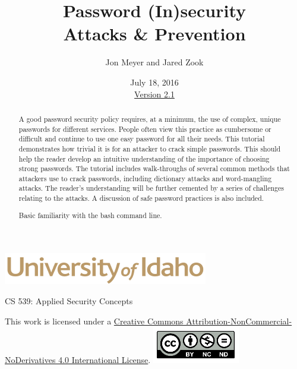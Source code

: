 \documentclass[12pt]{extarticle}
\begin{document}
\title{ Password (In)security \\ \large Attacks \& Prevention}
\author{Jon Meyer and Jared Zook}
\date{July 18, 2016 \\ \hyperref[changelog]{Version 2.1} }
\renewcommand{\abstractname}{Summary}
\begin{titlepage}
\maketitle
{}
\begin{center}
\includegraphics[scale=.5]{UofI}

\large{CS 539: Applied Security Concepts}

\vskip 40pt

\end{center}

\begin{abstract}
A good password security policy requires, at a minimum, the use of complex, unique passwords for different services. People often view this practice as cumbersome or difficult and continue to use one easy password for all their needs. This tutorial demonstrates how trivial it is for an attacker to crack simple passwords. This should help the reader develop an intuitive understanding of the importance of choosing strong passwords. The tutorial includes walk-throughs of several common methods that attackers use to crack passwords, including dictionary attacks and word-mangling attacks. The reader's understanding will be further cemented by a series of challenges relating to the attacks. A discussion of safe password practices is also included.


Basic familiarity with the bash command line.
\end{abstract}


\vfill
\begin{center}
This work is licensed under a \href{http://creativecommons.org/licenses/by/4.0/}{Creative Commons Attribution-NonCommercial-NoDerivatives 4.0 International License}.
\vskip 10pt
\includegraphics[scale=.5]{cc}
\end{center}

\end{titlepage}
\end{document}
